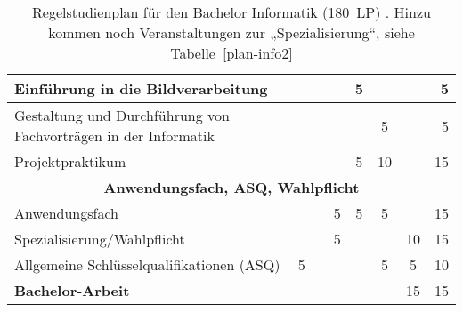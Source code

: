 \begin{table}[tbp]
\begin{small}
\begin{tabularx}{\textwidth}{|X||c|c|c|c|c|c||r|}
			Einführung in die Bildverarbeitung                                    &    &    &    & 5  &    &                               &                                                                     5 \\ \hline
			Gestaltung und Durchführung von Fachvorträgen in der Informatik       &    &    &    &    & 5  &                               &                                                                     5 \\ \hline
			Projektpraktikum                                                      &    &    &    & 5  & 10 &                               &                                                                    15 \\ \hline\hline
			\multicolumn{8}{|c|}{\textbf{Anwendungsfach, ASQ, Wahlpflicht}} \\ \hline
			Anwendungsfach                                                        &    &    & 5  & 5  & 5  &                               &                                                                    15 \\ \hline
			Spezialisierung/Wahlpflicht                                           &    &    & 5  &    &    &              10               &                                                                    15 \\ \hline
			Allgemeine Schlüsselqualifikationen (ASQ)                             & 5  &    &    &    & 5  &               5               &                                                                    10 \\ \hline\hline
			\textbf{Bachelor-Arbeit}                                              &    &    &    &    &    &              15               &                                                                    15 \\ \hline
		\end{tabularx}
	\end{small}
	\caption{Regelstudienplan für den Bachelor Informatik (180~LP)
		\label{plan-info}. Hinzu kommen noch Veranstaltungen zur „Spezialisierung“, siehe Tabelle~\ref{plan-info2}}
\end{table}


